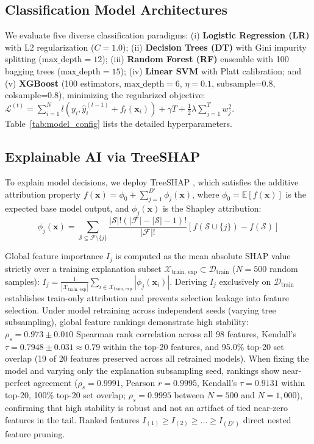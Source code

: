 \subsection{Classification Model Architectures}
We evaluate five diverse classification paradigms: (i) \textbf{Logistic Regression (LR)} with L2 regularization ($C=1.0$); (ii) \textbf{Decision Trees (DT)} with Gini impurity splitting ($\text{max\_depth}=12$); (iii) \textbf{Random Forest (RF)} ensemble with 100 bagging trees ($\text{max\_depth}=15$); (iv) \textbf{Linear SVM} with Platt calibration; and (v) \textbf{XGBoost} \cite{chen2016xgboost} (100 estimators, $\text{max\_depth}=6$, $\eta=0.1$, subsample=0.8, colsample=0.8), minimizing the regularized objective: $\mathcal{L}^{(t)} = \sum_{i=1}^N l\left(y_i, \hat{y}_i^{(t-1)} + f_t(\mathbf{x}_i)\right) + \gamma T + \frac{1}{2}\lambda \sum_{j=1}^T w_j^2$. Table~\ref{tab:model_config} lists the detailed hyperparameters.



\subsection{Explainable AI via TreeSHAP}
To explain model decisions, we deploy TreeSHAP \cite{lundberg2020local, lundberg2017unified}, which satisfies the additive attribution property $f(\mathbf{x}) = \phi_0 + \sum_{j=1}^{D'} \phi_j(\mathbf{x})$, where $\phi_0 = \mathbb{E}[f(\mathbf{x})]$ is the expected base model output, and $\phi_j(\mathbf{x})$ is the Shapley attribution:
\begin{equation}
\phi_j(\mathbf{x}) = \sum_{\mathcal{S} \subseteq \mathcal{F} \setminus \{j\}} \frac{|\mathcal{S}|! (|\mathcal{F}| - |\mathcal{S}| - 1)!}{|\mathcal{F}|!} \left[ f(\mathcal{S} \cup \{j\}) - f(\mathcal{S}) \right]
\label{eq:shap_formula}
\end{equation}

Global feature importance $I_j$ is computed as the mean absolute SHAP value strictly over a training explanation subset $\mathcal{X}_{\text{train, exp}} \subset \mathcal{D}_{\text{train}}$ ($N=500$ random samples): $I_j = \frac{1}{|\mathcal{X}_{\text{train, exp}}|} \sum_{i \in \mathcal{X}_{\text{train, exp}}} |\phi_j(\mathbf{x}_i)|$. Deriving $I_j$ exclusively on $\mathcal{D}_{\text{train}}$ establishes train-only attribution and prevents selection leakage into feature selection. Under model retraining across independent seeds (varying tree subsampling), global feature rankings demonstrate high stability: $\rho_s = 0.973 \pm 0.010$ Spearman rank correlation across all 98 features, Kendall's $\tau = 0.7948 \pm 0.031 \approx 0.79$ within the top-20 features, and 95.0\% top-20 set overlap (19 of 20 features preserved across all retrained models). When fixing the model and varying only the explanation subsampling seed, rankings show near-perfect agreement ($\rho_s = 0.9991$, Pearson $r = 0.9995$, Kendall's $\tau = 0.9131$ within top-20, 100\% top-20 set overlap; $\rho_s = 0.9995$ between $N=500$ and $N=1,000$), confirming that high stability is robust and not an artifact of tied near-zero features in the tail. Ranked features $I_{(1)} \ge I_{(2)} \ge \dots \ge I_{(D')}$ direct nested feature pruning.

